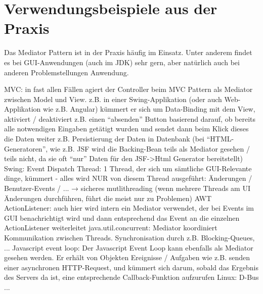 \section{Verwendungsbeispiele aus der Praxis}\label{ref:VerwendungPraxis}
Das Mediator Pattern ist in der Praxis häufig im Einsatz. Unter anderem findet es bei GUI-Anwendungen (auch im JDK) sehr gern, aber natürlich auch bei anderen Problemstellungen Anwendung.
\begin{outline}
    \1 MVC: in fast allen Fällen agiert der Controller beim MVC Pattern als Mediator zwischen Model und View. z.B. in einer Swing-Applikation (oder auch Web-Applikation wie z.B. Angular) kümmert er sich um Data-Binding mit dem View, aktiviert / deaktiviert z.B. einen \enquote{absenden} Button basierend darauf, ob bereits alle notwendigen Eingaben getätigt wurden und sendet dann beim Klick dieses die Daten weiter z.B. Persistierung der Daten in Datenbank
    (bei \enquote{HTML-Generatoren}, wie z.B. JSF wird die Backing-Bean teils als Mediator gesehen / teils nicht, da sie oft \enquote{nur} Daten für den JSF->Html Generator bereitstellt)
    \1 Swing: Event Dispatch Thread: 1 Thread, der sich um sämtliche GUI-Relevante dinge, kümmert - alles wird NUR von diesem Thread ausgeführt: Änderungen / Benutzer-Events / ... → sicheres mutlithreading (wenn mehrere Threads am UI Änderungen durchführen, führt die meist nur zu Problemen)
    \1 AWT ActionListener: auch hier wird intern ein Mediator verwendet, der bei Events im GUI benachrichtigt wird und dann entsprechend das Event an die einzelnen ActionListener weiterleitet
    \1 java.util.concurrent: Mediator koordiniert Kommunikation zwischen Threads. Synchronisation durch z.B. Blocking-Queues, ...
    \1 Javascript event loop: Der Javascript Event Loop kann ebenfalls als Mediator gesehen werden. Er erhält von Objekten Ereignisse / Aufgaben wie z.B. senden einer asynchronen HTTP-Request, und kümmert sich darum, sobald das Ergebnis des Servers da ist, eine entsprechende Callback-Funktion aufzurufen
    \1 Linux: D-Bus
    \1 ...
\end{outline}

